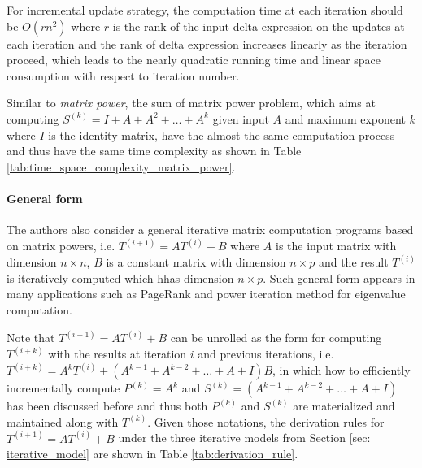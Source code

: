 For incremental update strategy, the computation time at each iteration should be $O(rn^2)$ where $r$ is the rank of the input delta expression on the updates at each iteration and the rank of delta expression increases linearly as the iteration proceed, which leads to the nearly quadratic running time and linear space consumption with respect to iteration number.

Similar to {\em matrix power}, the sum of matrix power problem, which aims at computing $S^{(k)} = I + A + A^2 + \dots + A^k$ given input $A$ and maximum exponent $k$ where $I$ is the identity matrix, have the almost the same computation process and thus have the same time complexity as shown in Table \ref{tab:time_space_complexity_matrix_power}. 

\paragraph{General form} The authors also consider a general iterative matrix computation programs based on matrix powers, i.e. $T^{(i+1)} = AT^{(i)} + B$ where $A$ is the input matrix with dimension $n \times n$, $B$ is a constant matrix with dimension $n \times p$ and the result $T^{(i)}$ is iteratively computed which hhas dimension $n \times p$. Such general form appears in many applications such as PageRank and power iteration method for eigenvalue computation. 

Note that $T^{(i+1)} = AT^{(i)} + B$ can be unrolled as the form for computing $T^{(i+k)}$ with the results at iteration $i$ and previous iterations, i.e. $T^{(i+k)} = A^kT^{(i)} + (A^{k-1} + A^{k-2} + \dots + A + I) B$, in which how to efficiently incrementally compute $P^{(k)} = A^k$ and $S^{(k)} = (A^{k-1} + A^{k-2} + \dots + A + I)$ has been discussed before and thus both $P^{(k)}$ and $S^{(k)}$ are materialized and maintained along with $T^{(k)}$. Given those notations, the derivation rules for $T^{(i+1)} = AT^{(i)} + B$ under the three iterative models from Section \ref{sec: iterative_model} are shown in Table \ref{tab:derivation_rule}.

